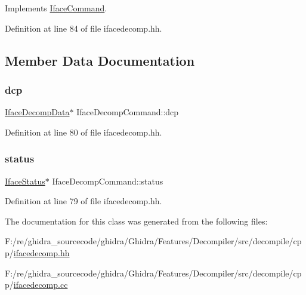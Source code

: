 Implements \mbox{\hyperlink{class_iface_command_ad0a0ba80d392ef1346c43283a8c3ca90}{Iface\+Command}}.



Definition at line 84 of file ifacedecomp.\+hh.



\subsection{Member Data Documentation}
\mbox{\label{class_iface_decomp_command_a577eeaba407343565278a765a17bf4b7}} 
\subsubsection{\texorpdfstring{dcp}{dcp}}
{\footnotesize\ttfamily \mbox{\hyperlink{class_iface_decomp_data}{Iface\+Decomp\+Data}}$\ast$ Iface\+Decomp\+Command\+::dcp\hspace{0.3cm}{\ttfamily [protected]}}



Definition at line 80 of file ifacedecomp.\+hh.

\mbox{\label{class_iface_decomp_command_a23377b0b15a552563f0558c2c3f155f5}} 
\subsubsection{\texorpdfstring{status}{status}}
{\footnotesize\ttfamily \mbox{\hyperlink{class_iface_status}{Iface\+Status}}$\ast$ Iface\+Decomp\+Command\+::status\hspace{0.3cm}{\ttfamily [protected]}}



Definition at line 79 of file ifacedecomp.\+hh.



The documentation for this class was generated from the following files\+:\begin{DoxyCompactItemize}
\item 
F\+:/re/ghidra\+\_\+sourcecode/ghidra/\+Ghidra/\+Features/\+Decompiler/src/decompile/cpp/\mbox{\hyperlink{ifacedecomp_8hh}{ifacedecomp.\+hh}}\item 
F\+:/re/ghidra\+\_\+sourcecode/ghidra/\+Ghidra/\+Features/\+Decompiler/src/decompile/cpp/\mbox{\hyperlink{ifacedecomp_8cc}{ifacedecomp.\+cc}}\end{DoxyCompactItemize}
